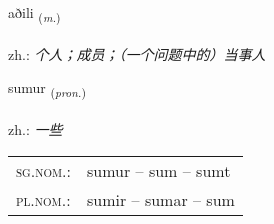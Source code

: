 \documentclass[frontgrid, backgrid]{flacards}\usepackage[]{graphicx}\usepackage[]{xcolor}
\begin{document}
\renewcommand{\blhead}{\vskip5pt {\small\bfseries\footnotesize Nafnorð | 名词 }}
\renewcommand{\bcfoot}{\vskip5pt \hspace{2pt}{\small\bfseries\footnotesize 1K}}


{aðili \small{\textsubscript{(\textit{m.})}} \\[1ex] %
\textphonetic{[aːðɪlɪ]} \\
zh.: \emph{个人；成员；（一个问题中的）当事人} \\  [2ex]
\renewcommand*{\arraystretch}{0.8}
}

\renewcommand{\flhead}{\vskip5pt \fboxsep=0pt {\small\bfseries\footnotesize Fornafn | 代词}}
\renewcommand{\fcfoot}{\vskip5pt \fboxsep=0pt \hspace{2pt}{\small\bfseries\footnotesize 1K}}

\renewcommand{\blhead}{\vskip5pt {\small\bfseries\footnotesize Fornafn | 代词 }}
\renewcommand{\bcfoot}{\vskip5pt \hspace{2pt}{\small\bfseries\footnotesize 1K}}


{sumur \small{\textsubscript{(\textit{pron.})}} \\[1ex] %
\textphonetic{[sʏːmʏr]} \\
zh.: \emph{一些} \\  [2ex]
\renewcommand*{\arraystretch}{0.8}
\begin{tabular}{ll}
\textsc{sg.nom.}: & sumur  --  sum -- sumt \\ 
\textsc{pl.nom.}: & sumir -- sumar -- sum
\end{tabular}
}

\renewcommand{\flhead}{\vskip5pt \fboxsep=0pt {\small\bfseries\footnotesize Sagnorð | 动词}}
\renewcommand{\fcfoot}{\vskip5pt \fboxsep=0pt \hspace{2pt}{\small\bfseries\footnotesize 1K}}
\end{document}
